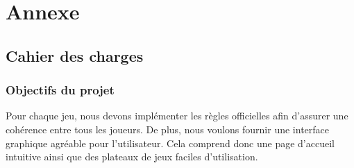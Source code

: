 \section{Annexe}
\subsection{Cahier des charges}

\subsubsection{Objectifs du projet}
Pour chaque jeu, nous devons implémenter les règles officielles afin d'assurer une cohérence
entre tous les joueurs. De plus, nous voulons fournir une interface graphique agréable pour l'utilisateur. 
Cela comprend donc une page d'accueil intuitive ainsi que des plateaux de jeux faciles d'utilisation.

